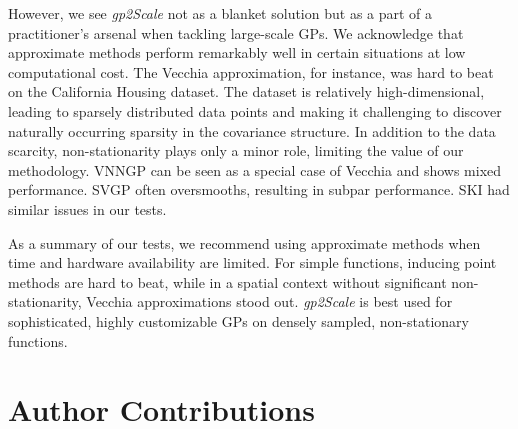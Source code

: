 \documentclass{article}
\begin{document}
However, we see \emph{gp2Scale} not as a blanket solution but as a part of a practitioner's arsenal when tackling large-scale GPs. 
We acknowledge that approximate methods perform remarkably well in certain situations at low computational cost.  
The Vecchia approximation, for instance, was hard to beat on the California Housing dataset. The dataset is relatively high-dimensional, leading to sparsely distributed data points and making it challenging to discover naturally occurring sparsity in the covariance structure. In addition to the data scarcity, non-stationarity plays only a minor role, limiting the value of our methodology. VNNGP can be seen as a special case of Vecchia and shows mixed performance. SVGP often oversmooths, resulting in subpar performance. SKI had similar issues in our tests.    


As a summary of our tests, we recommend using approximate methods when time and hardware availability are limited. For simple functions, inducing point methods are hard to beat, while in a spatial context without significant non-stationarity, Vecchia approximations stood out. \emph{gp2Scale} is best used for sophisticated, highly customizable GPs on densely sampled, non-stationary functions.  


\section*{Author Contributions}
\end{document}

